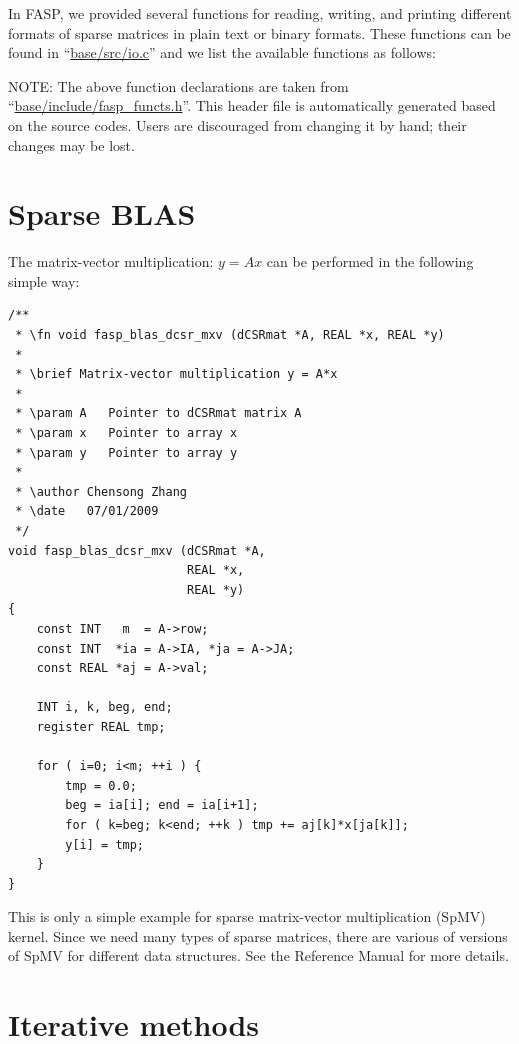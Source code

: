 \documentclass[11pt]{memoir}
\begin{document}
In FASP, we provided several functions for reading, writing, and printing different formats of sparse matrices in plain text or binary formats. These functions can be found in ``\url{base/src/io.c}'' and we list the available functions as follows:
%

%
\begin{snugshade}\noindent
  NOTE: The above function declarations are taken from
  ``\url{base/include/fasp\_functs.h}''. This header file is
  automatically generated based on the source codes. Users are discouraged
  from changing it by hand; their changes may be lost. 
\end{snugshade}


\section{Sparse BLAS}

The matrix-vector multiplication: $y=Ax$ can be performed in the
following simple way:

\begin{lstlisting}
/**
 * \fn void fasp_blas_dcsr_mxv (dCSRmat *A, REAL *x, REAL *y)
 *
 * \brief Matrix-vector multiplication y = A*x
 *
 * \param A   Pointer to dCSRmat matrix A
 * \param x   Pointer to array x
 * \param y   Pointer to array y
 *
 * \author Chensong Zhang
 * \date   07/01/2009
 */
void fasp_blas_dcsr_mxv (dCSRmat *A,
                         REAL *x,
                         REAL *y)
{
    const INT   m  = A->row;
    const INT  *ia = A->IA, *ja = A->JA;
    const REAL *aj = A->val;

    INT i, k, beg, end;
    register REAL tmp;

    for ( i=0; i<m; ++i ) {
        tmp = 0.0;
        beg = ia[i]; end = ia[i+1];
        for ( k=beg; k<end; ++k ) tmp += aj[k]*x[ja[k]];
        y[i] = tmp;
    }
}
\end{lstlisting}

This is only a simple example for sparse matrix-vector multiplication (SpMV) kernel. Since we need many types of sparse matrices, there are various of versions of SpMV for different data structures. See the Reference Manual for more details.

\section{Iterative methods}\label{sec:iter}
\end{document}
